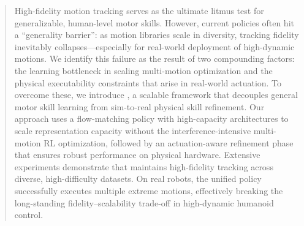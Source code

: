 \begin{abstract}

High-fidelity motion tracking serves as the ultimate litmus test for generalizable, human-level motor skills. However, current policies often hit a ``generality barrier'': as motion libraries scale in diversity, tracking fidelity inevitably collapses—especially for real-world deployment of high-dynamic motions. We identify this failure as the result of two compounding factors: the learning bottleneck in scaling multi-motion optimization and the physical executability constraints that arise in real-world actuation. To overcome these, we introduce \model, a scalable framework that decouples general motor skill learning from sim-to-real physical skill refinement. Our approach uses a flow-matching policy with high-capacity architectures to scale representation capacity without the interference-intensive multi-motion RL optimization, followed by an actuation-aware refinement phase that ensures robust performance on physical hardware. Extensive experiments demonstrate that \model maintains high-fidelity tracking across diverse, high-difficulty datasets. On real robots, the unified policy successfully executes multiple extreme motions, effectively breaking the long-standing fidelity–scalability trade-off in high-dynamic humanoid control.



\end{abstract}

